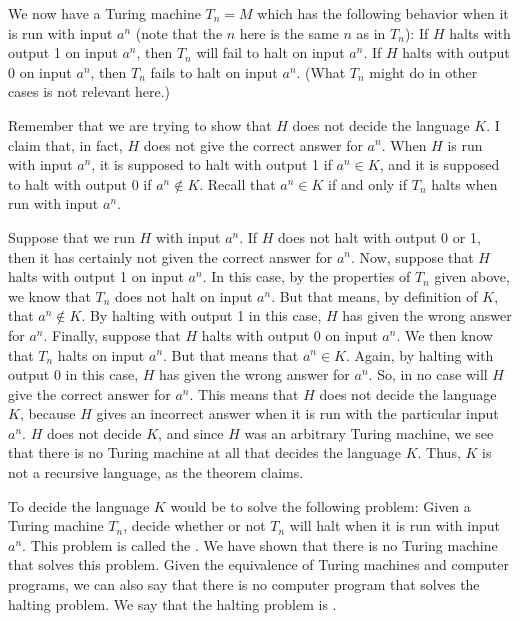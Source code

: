 We now have a Turing machine $T_n = M$ which has the following behavior
when it is run with input $a^n$ (note that the $n$ here is the same $n$ as
in $T_n$):
If $H$ halts with output 1 on input $a^n$, then $T_n$
will fail to halt on input $a^n$.  If $H$ halts with output 0
on input $a^n$, then $T_n$ fails to halt on input $a^n$.  (What $T_n$
might do in other cases is not relevant here.)

Remember that we are trying to show that $H$ does not decide the language
$K$.  I claim that, in fact, $H$ does not give the correct answer for $a^n$.  When $H$
is run with input $a^n$, it is supposed to halt with output 1 if $a^n\in K$,
and it is supposed to halt with output 0 if $a^n\not\in K$.  Recall that
$a^n\in K$ if and only if $T_n$ halts when run with input $a^n$.

Suppose that we run $H$ with input $a^n$.
If $H$ does not halt with output 0 or 1, then it has certainly not given the 
correct answer for $a^n$.  Now, suppose that $H$ halts with output 1 on input $a^n$.
In this case, by the properties of $T_n$ given above, we know that $T_n$ does not
halt on input $a^n$.  But that means, by definition of $K$, 
that $a^n\not\in K$.  By halting with output
1 in this case, $H$ has given the wrong answer for $a^n$.  Finally, suppose that
$H$ halts with output 0 on input $a^n$.  We then know that $T_n$ halts
on input $a^n$.  But that means that $a^n\in K$.  Again, by halting with output
0 in this case, $H$ has given the wrong answer for $a^n$.  So, in no case will
$H$ give the correct answer for $a^n$.  
This means that
$H$ does not decide the language $K$, because $H$ gives
an incorrect answer when it is run with the particular input $a^n$.
$H$ does not decide $K$, and since
$H$ was an arbitrary Turing machine, we see that there is
no Turing machine at all that decides the language $K$.  Thus,
$K$ is not a recursive language, as the theorem claims. 

\medbreak

To decide the language $K$ would be to solve the following
problem:  Given a Turing machine $T_n$, decide whether or
not $T_n$ will halt when it is run with input $a^n$.  This
problem is called the .  We have shown
that there is no Turing machine that solves this problem.
Given the equivalence of Turing machines and computer programs,
we can also say that there is no computer program that
solves the halting problem.  We say that the halting problem
is .

